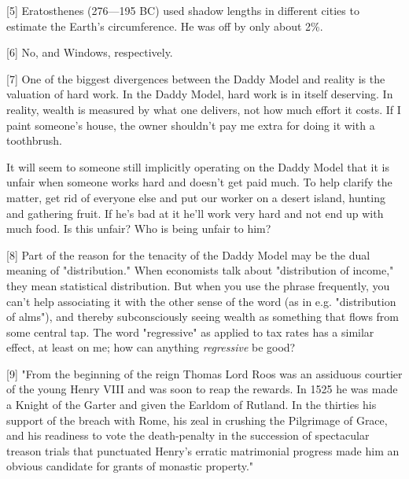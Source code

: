 [5] Eratosthenes (276---195 BC) used shadow lengths in
                  different cities to estimate the Earth's circumference. He was
                  off by only about 2\%.

[6] No, and Windows, respectively.

[7] One of the biggest divergences between the Daddy Model and
                  reality is the valuation of hard work. In the Daddy Model,
                  hard work is in itself deserving. In reality, wealth is
                  measured by what one delivers, not how much effort it costs.
                  If I paint someone's house, the owner shouldn't pay me extra
                  for doing it with a toothbrush.

It will seem to
                  someone still implicitly operating on the Daddy Model that it
                  is unfair when someone works hard and doesn't get paid much.
                  To help clarify the matter, get rid of everyone else and put
                  our worker on a desert island, hunting and gathering fruit. If
                  he's bad at it he'll work very hard and not end up with much
                  food. Is this unfair? Who is being unfair to him?

[8] Part of the reason for the tenacity of the Daddy Model may
                  be the dual meaning of "distribution." When economists talk
                  about "distribution of income," they mean statistical
                  distribution. But when you use the phrase frequently, you
                  can't help associating it with the other sense of the word (as
                  in e.g. "distribution of alms"), and thereby subconsciously
                  seeing wealth as something that flows from some central tap.
                  The word "regressive" as applied to tax rates has a similar
                  effect, at least on me; how can anything \emph{regressive} be
                  good?

[9] "From the beginning of the reign Thomas Lord Roos was an
                  assiduous courtier of the young Henry VIII and was soon to
                  reap the rewards. In 1525 he was made a Knight of the Garter
                  and given the Earldom of Rutland. In the thirties his support
                  of the breach with Rome, his zeal in crushing the Pilgrimage
                  of Grace, and his readiness to vote the death-penalty in the
                  succession of spectacular treason trials that punctuated
                  Henry's erratic matrimonial progress made him an obvious
                  candidate for grants of monastic property."

